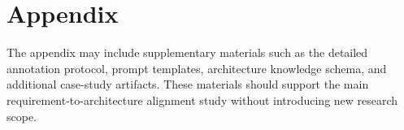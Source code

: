 \section{Appendix}
\label{appendix}

The appendix may include supplementary materials such as the detailed annotation protocol, prompt templates, architecture knowledge schema, and additional case-study artifacts.
These materials should support the main requirement-to-architecture alignment study without introducing new research scope.
